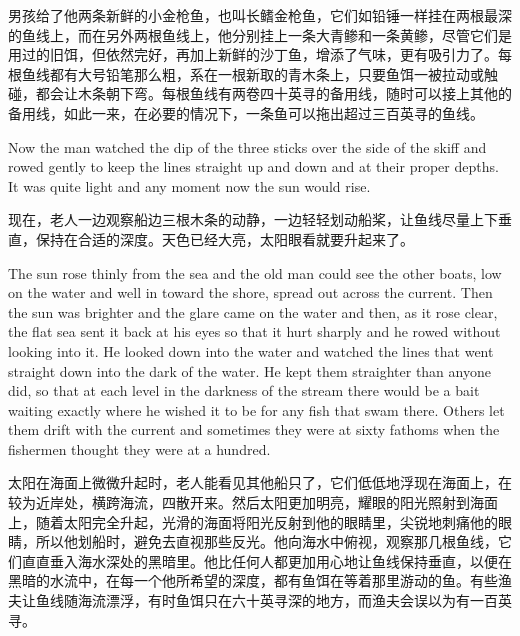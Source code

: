 \begin{paracol}{2}
\switchcolumn

男孩给了他两条新鲜的小金枪鱼，也叫长鳍金枪鱼，它们如铅锤一样挂在两根最深的鱼线上，而在另外两根鱼线上，他分别挂上一条大青鲹和一条黄鲹，尽管它们是用过的旧饵，但依然完好，再加上新鲜的沙丁鱼，增添了气味，更有吸引力了。每根鱼线都有大号铅笔那么粗，系在一根新取的青木条上，只要鱼饵一被拉动或触碰，都会让木条朝下弯。每根鱼线有两卷四十英寻的备用线，随时可以接上其他的备用线，如此一来，在必要的情况下，一条鱼可以拖出超过三百英寻的鱼线。

\switchcolumn*

Now the man watched the dip of the three sticks over the side of the skiff
and rowed gently to keep the lines \gls{straight} up and down and at their \gls{proper}
depths. It was quite light and any moment now the sun would rise.

\switchcolumn

现在，老人一边观察船边三根木条的动静，一边轻轻划动船桨，让鱼线尽量上下垂直，保持在合适的深度。天色已经大亮，太阳眼看就要升起来了。

\switchcolumn*

The sun rose \gls{thinly} from the sea and the old man could see the other boats,
low on the water and well in \gls{toward} the \gls{shore}, spread out across the
current. Then the sun was brighter and the \gls{glare} came on the water and
then, as it rose clear, the \gls{flat} sea sent it back at his eyes so that it
hurt \gls{sharply} and he rowed without looking into it. He looked down into the
water and watched the lines that went straight down into the dark of the
water. He kept them straighter than anyone did, so that at each level in
the darkness of the stream there would be a bait waiting exactly where he
wished it to be for any fish that swam there. Others let them drift with
the current and sometimes they were at sixty fathoms when the fishermen
thought they were at a hundred.

\switchcolumn

太阳在海面上微微升起时，老人能看见其他船只了，它们低低地浮现在海面上，在较为近岸处，横跨海流，四散开来。然后太阳更加明亮，耀眼的阳光照射到海面上，随着太阳完全升起，光滑的海面将阳光反射到他的眼睛里，尖锐地刺痛他的眼睛，所以他划船时，避免去直视那些反光。他向海水中俯视，观察那几根鱼线，它们直直垂入海水深处的黑暗里。他比任何人都更加用心地让鱼线保持垂直，以便在黑暗的水流中，在每一个他所希望的深度，都有鱼饵在等着那里游动的鱼。有些渔夫让鱼线随海流漂浮，有时鱼饵只在六十英寻深的地方，而渔夫会误以为有一百英寻。

\switchcolumn*


\end{paracol}
